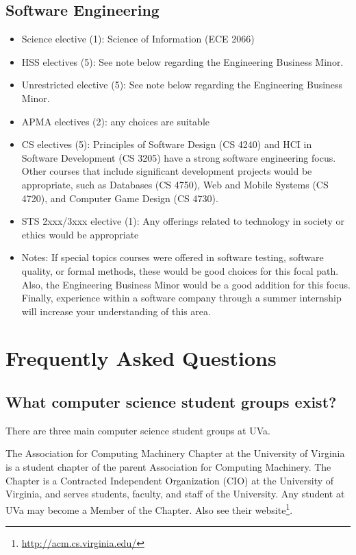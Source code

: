 \documentclass[10pt,letter]{book}
\newenvironment{itemlist}{
\begin{itemize}
\setlength{\itemsep}{0pt}
\setlength{\parskip}{0pt}}
{\end{itemize}}
\newcommand{\mysection}[1]{\section{#1}\renewcommand{\rightmark}{#1}}
\newcommand{\myurl}[1]{\footnote{\scriptsize\url{#1}}}
\begin{document}
\subsection{Software Engineering}
\begin{itemlist}
\item Science elective (1): Science of Information (ECE 2066)
\item HSS electives (5): See note below regarding the Engineering
  Business Minor.
\item Unrestricted elective (5): See note below regarding the
  Engineering Business Minor.
\item APMA electives (2): any choices are suitable
\item CS electives (5): Principles of Software Design (CS 4240) and
  HCI in Software Development (CS 3205) have a strong software
  engineering focus. Other courses that include significant development
  projects would be appropriate, such as Databases (CS 4750), Web and
  Mobile Systems (CS 4720), and Computer Game Design (CS 4730).
\item STS 2xxx/3xxx elective (1): Any offerings related to technology
  in society or ethics would be appropriate
\item Notes: If special topics courses were offered in software
  testing, software quality, or formal methods, these would be good
  choices for this focal path. Also, the Engineering Business Minor
  would be a good addition for this focus. Finally, experience within
  a software company through a summer internship will increase your
  understanding of this area.
\end{itemlist}

\mysection{Frequently Asked Questions}

\subsection{What computer science student groups exist?}

There are three main computer science student groups at UVa.

The Association for Computing Machinery Chapter at the University of
Virginia is a student chapter of the parent Association for Computing
Machinery. The Chapter is a Contracted Independent Organization (CIO)
at the University of Virginia, and serves students, faculty, and staff
of the University. Any student at UVa may become a Member of the
Chapter.  Also see their website\myurl{http://acm.cs.virginia.edu/}.
\end{document}
